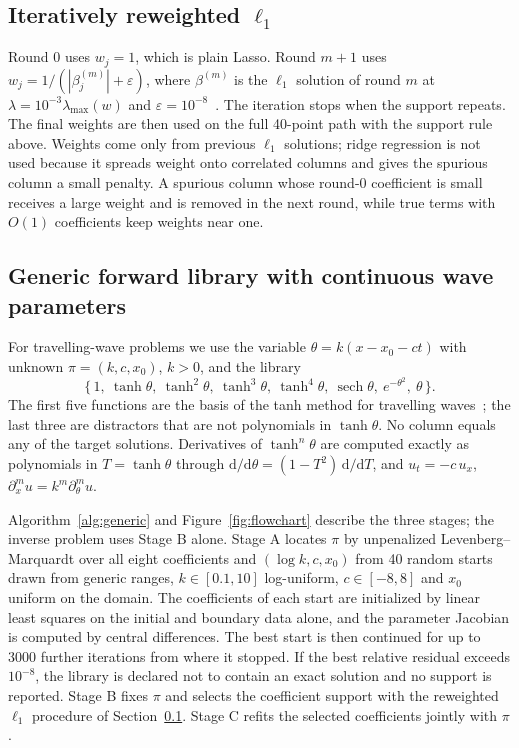 \documentclass{article}
\newcommand{\sech}{\operatorname{sech}}
\begin{document}
\subsection{Iteratively reweighted $\ell_1$}
\label{sec:irl1}
Round 0 uses $w_j = 1$, which is plain Lasso. Round $m+1$ uses $w_j = 1/(|\beta_j^{(m)}| + \varepsilon)$, where $\beta^{(m)}$ is the $\ell_1$ solution of round $m$ at $\lambda = 10^{-3}\lambda_{\max}(w)$ and $\varepsilon = 10^{-8}$~\citep{candes2008irl1}. The iteration stops when the support repeats. The final weights are then used on the full 40-point path with the support rule above. Weights come only from previous $\ell_1$ solutions; ridge regression is not used because it spreads weight onto correlated columns and gives the spurious column a small penalty. A spurious column whose round-0 coefficient is small receives a large weight and is removed in the next round, while true terms with $O(1)$ coefficients keep weights near one.

\subsection{Generic forward library with continuous wave parameters}
\label{sec:generic}
For travelling-wave problems we use the variable $\theta = k(x - x_0 - ct)$ with unknown $\pi = (k, c, x_0)$, $k > 0$, and the library
\begin{equation}
\{\,1,\ \tanh\theta,\ \tanh^2\theta,\ \tanh^3\theta,\ \tanh^4\theta,\ \sech\theta,\ e^{-\theta^2},\ \theta\,\}.
\label{eq:generic-library}
\end{equation}
The first five functions are the basis of the tanh method for travelling waves~\citep{malfliet1992tanh}; the last three are distractors that are not polynomials in $\tanh\theta$. No column equals any of the target solutions. Derivatives of $\tanh^n\theta$ are computed exactly as polynomials in $T=\tanh\theta$ through $\mathrm{d}/\mathrm{d}\theta = (1 - T^2)\,\mathrm{d}/\mathrm{d}T$, and $u_t = -c\,u_x$, $\partial_x^m u = k^m \partial_\theta^m u$.

Algorithm~\ref{alg:generic} and Figure~\ref{fig:flowchart} describe the three stages; the inverse problem uses Stage B alone. Stage A locates $\pi$ by unpenalized Levenberg--Marquardt over all eight coefficients and $(\log k, c, x_0)$ from 40 random starts drawn from generic ranges, $k \in [0.1, 10]$ log-uniform, $c \in [-8, 8]$ and $x_0$ uniform on the domain. The coefficients of each start are initialized by linear least squares on the initial and boundary data alone, and the parameter Jacobian is computed by central differences. The best start is then continued for up to 3000 further iterations from where it stopped. If the best relative residual exceeds $10^{-8}$, the library is declared not to contain an exact solution and no support is reported. Stage B fixes $\pi$ and selects the coefficient support with the reweighted $\ell_1$ procedure of Section~\ref{sec:irl1}. Stage C refits the selected coefficients jointly with $\pi$.
\end{document}
